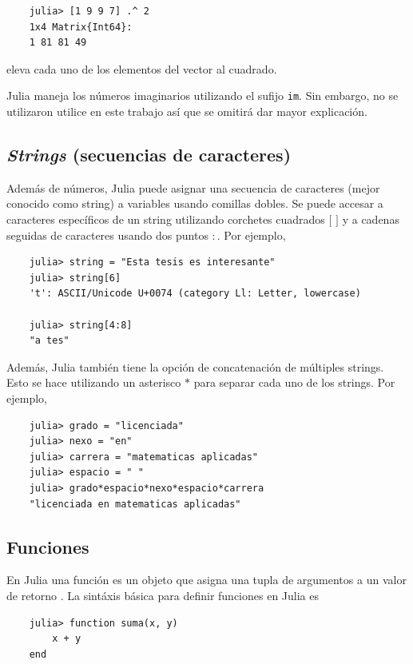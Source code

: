 \begin{verbatim}
	julia> [1 9 9 7] .^ 2
	1x4 Matrix{Int64}:
	1 81 81 49
\end{verbatim}

 \noindent eleva cada uno de los elementos del vector al cuadrado. 

\textsf{Julia} maneja los números imaginarios utilizando el sufijo \texttt{im}. Sin embargo, no se utilizaron utilice en este trabajo así que se omitirá dar mayor explicación. 

\subsection{\textit{Strings} (secuencias de caracteres)} 

Además de números, \textsf{Julia} puede asignar una secuencia de caracteres (mejor conocido como string) a variables usando comillas dobles. Se puede accesar a caracteres específicos de un string utilizando corchetes cuadrados $[$ $]$ y a cadenas seguidas de caracteres usando dos puntos $:$. Por ejemplo,

\begin{verbatim}
    julia> string = "Esta tesis es interesante"
    julia> string[6]
    't': ASCII/Unicode U+0074 (category Ll: Letter, lowercase)
    
    julia> string[4:8]
    "a tes"
\end{verbatim}

Además, \textsf{Julia} también tiene la opción de concatenación de múltiples strings. Esto se hace utilizando un asterisco $*$ para separar cada uno de los strings. Por ejemplo,

\begin{verbatim}
	julia> grado = "licenciada"
	julia> nexo = "en"
	julia> carrera = "matematicas aplicadas"
	julia> espacio = " "
	julia> grado*espacio*nexo*espacio*carrera
	"licenciada en matematicas aplicadas"
\end{verbatim}

\subsection{Funciones}
En \textsf{Julia} una función es un objeto que asigna una tupla de argumentos a un valor de retorno \cite{manual_Julia}. La sintáxis básica para definir funciones en \textsf{Julia} es 

\begin{verbatim}
	julia> function suma(x, y)
		x + y
	end
\end{verbatim}

